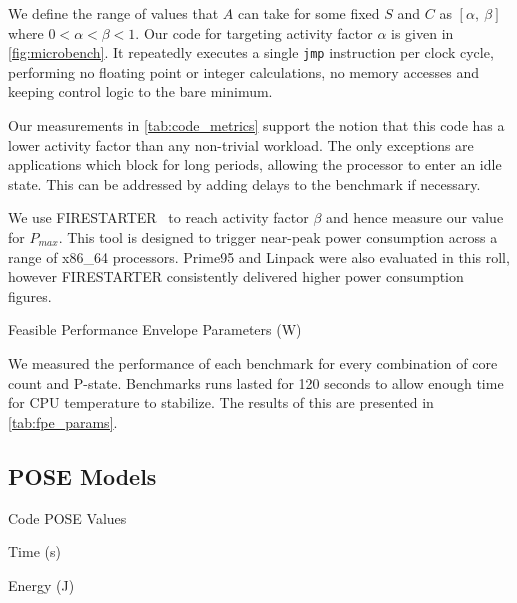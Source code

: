 We define the range of values that $A$ can take for some fixed $S$ and $C$ as $[\alpha,~\beta]$ where $0 < \alpha < \beta < 1$.
Our code for targeting activity factor $\alpha$ is given in \autoref{fig:microbench}.
It repeatedly executes a single \texttt{jmp} instruction per clock cycle, performing no floating point or integer calculations, no memory accesses and keeping control logic to the bare minimum.

Our measurements in \autoref{tab:code_metrics} support the notion that this code has a lower activity factor than any non-trivial workload.
The only exceptions are applications which block for long periods, allowing the processor to enter an idle state. 
This can be addressed by adding delays to the benchmark if necessary.

We use FIRESTARTER~\cite{hackenberg:2013ab} to reach activity factor $\beta$ and hence measure our value for $P_{max}$.
This tool is designed to trigger near-peak power consumption across a range of x86\_64 processors.
Prime95 and Linpack were also evaluated in this roll, however FIRESTARTER consistently delivered higher power consumption figures.

\begin{table}
\centering
\caption{Feasible Performance Envelope Parameters (W)}
\label{tab:fpe_params}

\end{table}

We measured the performance of each benchmark for every combination of core count and P-state.
Benchmarks runs lasted for 120 seconds to allow enough time for CPU temperature to stabilize.
The results of this are presented in \autoref{tab:fpe_params}.

\subsection{POSE Models}


\begin{table}
  \setlength{\tabcolsep}{.5em}
  \caption{Code POSE Values}
  \begin{subtable}{\textwidth}
  \centering
  \caption{Time (s)}
  
  \end{subtable}
  \begin{subtable}{\textwidth}
  \centering
  \caption{Energy (J)}
  
  \end{subtable}
  \label{tab:pose_params}
\end{table}



